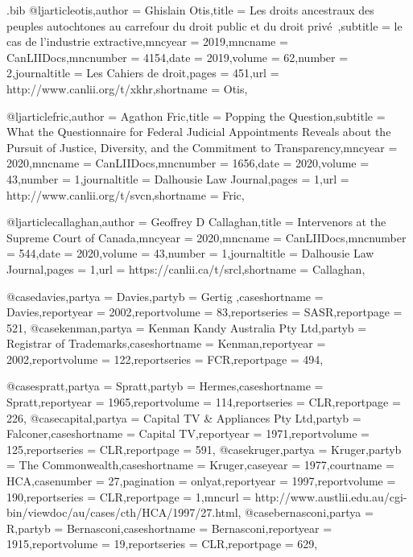\begin{filecontents*}[overwrite]{\jobname.bib}
@ljarticle{otis,author =  {Ghislain Otis},title =  {Les droits ancestraux des peuples autochtones au carrefour du droit public et du droit privé~},subtitle =  {le cas de l’industrie extractive},mncyear =  {2019},mncname =  {CanLIIDocs},mncnumber =  {4154},date =  {2019},volume =  {62},number =  {2},journaltitle =  {Les Cahiers de droit},pages =  {451},url =  {http://www.canlii.org/t/xkhr},shortname =  {Otis},}

@ljarticle{fric,author =  {Agathon Fric},title =  {Popping the Question},subtitle =  {What the Questionnaire for Federal Judicial Appointments Reveals about the Pursuit of Justice, Diversity, and the Commitment to Transparency},mncyear =  {2020},mncname =  {CanLIIDocs},mncnumber =  {1656},date =  {2020},volume =  {43},number =  {1},journaltitle =  {Dalhousie Law Journal},pages =  {1},url =  {http://www.canlii.org/t/svcn},shortname =  {Fric},}


@ljarticle{callaghan,author =  {Geoffrey D Callaghan},title =  {Intervenors at the Supreme Court of Canada},mncyear =  {2020},mncname =  {CanLIIDocs},mncnumber =  {544},date =  {2020},volume =  {43},number =  {1},journaltitle =  {Dalhousie Law Journal},pages =  {1},url =  {https://canlii.ca/t/srcl},shortname =  {Callaghan},}


@case{davies,partya =  {Davies},partyb =  {Gertig },caseshortname =  {Davies},reportyear =  {2002},reportvolume =  {83},reportseries =  {SASR},reportpage =  {521},}
@case{kenman,partya =  {Kenman Kandy Australia Pty Ltd},partyb =  {Registrar of Trademarks},caseshortname =  {Kenman},reportyear =  {2002},reportvolume =  {122},reportseries =  {FCR},reportpage =  {494},}

@case{spratt,partya =  {Spratt},partyb =  {Hermes},caseshortname =  {Spratt},reportyear =  {1965},reportvolume =  {114},reportseries =  {CLR},reportpage =  {226},}
@case{capital,partya =  {Capital TV \& Appliances Pty Ltd},partyb =  {Falconer},caseshortname =  {Capital TV},reportyear =  {1971},reportvolume =  {125},reportseries =  {CLR},reportpage =  {591},}
@case{kruger,partya =  {Kruger},partyb =  {The Commonwealth},caseshortname =  {Kruger},caseyear =  {1977},courtname =  {HCA},casenumber =  {27},pagination =  {onlyat},reportyear =  {1997},reportvolume =  {190},reportseries =  {CLR},reportpage =  {1},mncurl =  {http://www.austlii.edu.au/cgi-bin/viewdoc/au/cases/cth/HCA/1997/27.html},}
@case{bernasconi,partya =  {R},partyb =  {Bernasconi},caseshortname =  {Bernasconi},reportyear =  {1915},reportvolume =  {19},reportseries =  {CLR},reportpage =  {629},}



\end{filecontents*}
